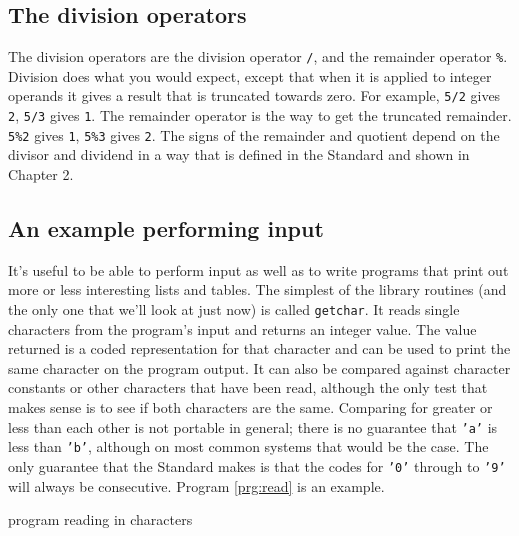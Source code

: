   

  \subsection{The division operators}
   

   
   The division operators are the division operator \texttt{/}, and the
    remainder operator \texttt{\%}. Division does what you would expect,
    except that when it is applied to integer operands it gives a result that
    is truncated towards zero. For example, \texttt{5/2} gives
    \texttt{2}, \texttt{5/3} gives \texttt{1}. The remainder
    operator is the way to get the truncated remainder. \texttt{5\%2} gives
    \texttt{1}, \texttt{5\%3} gives \texttt{2}. The signs of the
    remainder and quotient depend on the divisor and dividend in a way that is
    defined in the Standard and shown in Chapter 2.


  

  \subsection{An example performing input}
   

   It's useful to be able to perform input as well as to write programs
    that print out more or less interesting lists and tables. The simplest of
    the library routines (and the only one that we'll look at just now) is
    called \texttt{getchar}. It reads single characters from the program's
    input and returns an integer value. The value returned is a coded
    representation for that character and can be used to print the same
    character on the program output. It can also be compared against character
    constants or other characters that have been read, although the only test
    that makes sense is to see if both characters are the same. Comparing for
    greater or less than each other is not portable in general; there is no
    guarantee that \texttt{'a'} is less than \texttt{'b'}, although on
    most common systems that would be the case. The only guarantee that the
    Standard makes is that the codes for \texttt{'0'} through to
    \texttt{'9'} will always be consecutive.
    Program \ref{prg:read} is an example. 
    \begin{program}[phtb]
      \caption{\label{prg:read}program reading in characters}
    \end{program}
    
